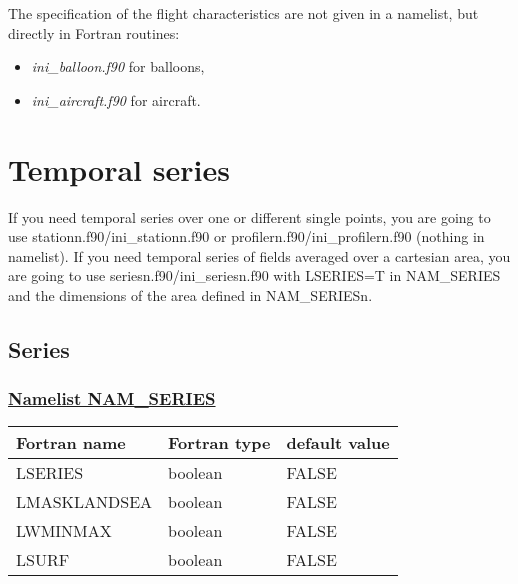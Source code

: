 The specification of the flight characteristics  are not given in a namelist,
but directly in Fortran routines:
\begin{itemize}
\item  {\it ini\_balloon.f90} for balloons,
\item  {\it ini\_aircraft.f90} for aircraft.
\end{itemize}

\section{Temporal series}
If you need temporal series over one or different single points, you are going to use stationn.f90/ini\_stationn.f90 or profilern.f90/ini\_profilern.f90 (nothing in namelist). If you need temporal series of fields averaged over a cartesian area, you are going to use seriesn.f90/ini\_seriesn.f90 with LSERIES=T in NAM\_SERIES and the dimensions of the area defined in NAM\_SERIESn.

\subsection{Series}
 
\subsubsection{\underline{Namelist NAM\_SERIES}}
\label{ss:series}
\begin{center}
\begin{tabular}{|l|l|l| }
\hline 
 Fortran name & Fortran type  & default value \\
\hline
LSERIES      & boolean & FALSE \\
LMASKLANDSEA & boolean & FALSE \\
LWMINMAX     & boolean & FALSE \\
LSURF        & boolean & FALSE \\
\hline
\end{tabular}
\end{center}

